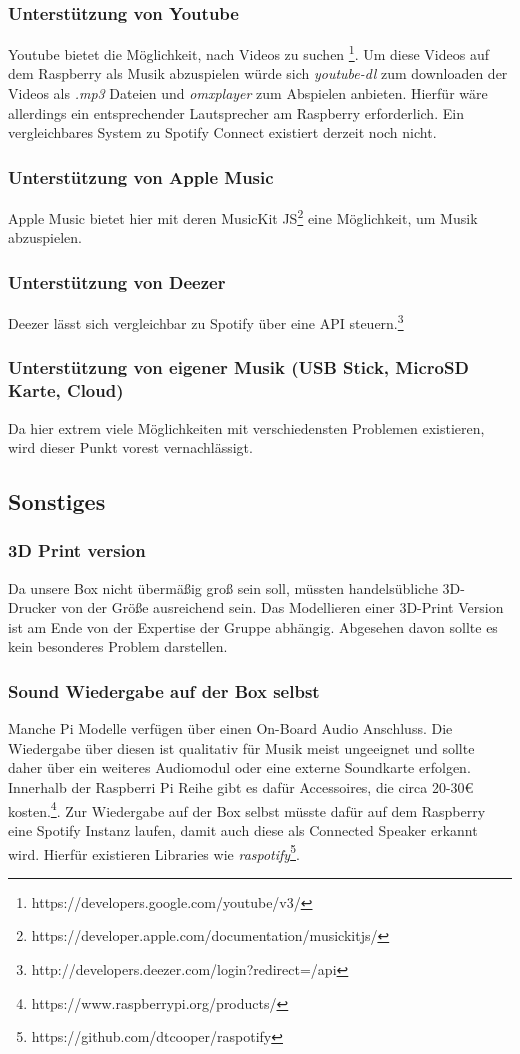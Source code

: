 \documentclass[10pt, a4paper, draft]{article}
\begin{document}
\subsubsection{Unterstützung von Youtube}
Youtube bietet die Möglichkeit, nach Videos zu suchen \footnote{https://developers.google.com/youtube/v3/}. Um diese Videos auf dem Raspberry als Musik abzuspielen würde sich \textit{youtube-dl} zum downloaden der Videos als \textit{.mp3} Dateien und \textit{omxplayer} zum Abspielen anbieten.
Hierfür wäre allerdings ein entsprechender Lautsprecher am Raspberry erforderlich. Ein vergleichbares System zu Spotify Connect existiert derzeit noch nicht.

\subsubsection{Unterstützung von Apple Music}
Apple Music bietet hier mit deren MusicKit JS\footnote{https://developer.apple.com/documentation/musickitjs/} eine Möglichkeit, um Musik abzuspielen.

\subsubsection{Unterstützung von Deezer}
Deezer lässt sich vergleichbar zu Spotify über eine API steuern.\footnote{http://developers.deezer.com/login?redirect=/api}

\subsubsection{Unterstützung von eigener Musik (USB Stick, MicroSD Karte, Cloud)}
Da hier extrem viele Möglichkeiten mit verschiedensten Problemen existieren, wird dieser Punkt vorest vernachlässigt.

\subsection{Sonstiges}
\subsubsection{3D Print version}
Da unsere Box nicht übermäßig groß sein soll, müssten handelsübliche 3D-Drucker von der Größe ausreichend sein.
Das Modellieren einer 3D-Print Version ist am Ende von der Expertise der Gruppe abhängig.
Abgesehen davon sollte es kein besonderes Problem darstellen.

\subsubsection{Sound Wiedergabe auf der Box selbst}
Manche Pi Modelle verfügen über einen On-Board Audio Anschluss.
Die Wiedergabe über diesen ist qualitativ für Musik meist ungeeignet und sollte daher über ein weiteres Audiomodul oder eine externe Soundkarte erfolgen.
Innerhalb der Raspberri Pi Reihe gibt es dafür Accessoires, die circa 20-30€ kosten.\footnote{https://www.raspberrypi.org/products/}.
Zur Wiedergabe auf der Box selbst müsste dafür auf dem Raspberry eine Spotify Instanz laufen, damit auch diese als Connected Speaker erkannt wird.
Hierfür existieren Libraries wie \textit{raspotify}\footnote{https://github.com/dtcooper/raspotify}.
\end{document}
